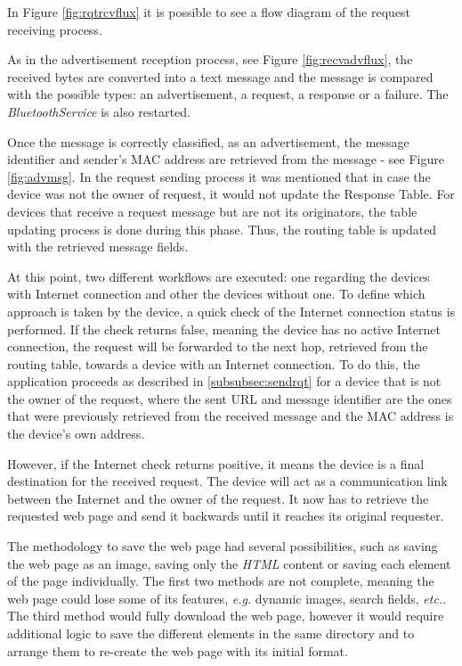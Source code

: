In Figure \ref{fig:rqtrcvflux} it is possible to see a flow diagram of the request receiving process.

As in the advertisement reception process, see Figure \ref{fig:recvadvflux}, the received bytes are converted into a text message and the message is compared with the possible types: an advertisement, a request, a response or a failure. The \textit{BluetoothService} is also restarted.

Once the message is correctly classified, as an advertisement, the message identifier and sender's \gls{MAC} address are retrieved from the message - see Figure \ref{fig:advmsg}. In the request sending process it was mentioned that in case the device was not the owner of request, it would not update the Response Table. For devices that receive a request message but are not its originators, the table updating process is done during this phase. Thus, the routing table is updated with the retrieved message fields.

At this point, two different workflows are executed: one regarding the devices with Internet connection and other the devices without one. To define which approach is taken by the device, a quick check of the Internet connection status is performed. If the check returns false, meaning the device has no active Internet connection, the request will be forwarded to the next hop, retrieved from the routing table, towards a device with an Internet connection. To do this, the application proceeds as described in \ref{subsubsec:sendrqt} for a device that is not the owner of the request, where the sent \gls{URL} and message identifier are the ones that were previously retrieved from the received message and the \gls{MAC} address is the device's own address.

However, if the Internet check returns positive, it means the device is a final destination for the received request. The device will act as a communication link between the Internet and the owner of the request. It now has to retrieve the requested web page and send it backwards until it reaches its original requester.

The methodology to save the web page had several possibilities, such as saving the web page as an image, saving only the \textit{HTML} content or saving each element of the page individually. The first two methods are not complete, meaning the web page could lose some of its features, \textit{e.g.} dynamic images, search fields, \textit{etc.}. The third method would fully download the web page, however it would require additional logic to save the different elements in the same directory and to arrange them to re-create the web page with its initial format.

